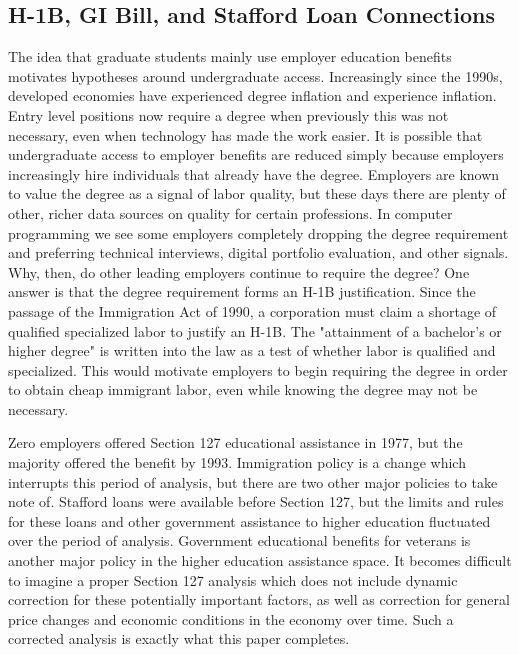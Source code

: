 \documentclass[review]{elsarticle}
\begin{document}
    \subsection{H-1B, GI Bill, and Stafford Loan Connections}
    The idea that graduate students mainly use employer education benefits motivates hypotheses around undergraduate access.
    Increasingly since the 1990s, developed economies have experienced degree inflation and experience inflation.
    Entry level positions now require a degree when previously this was not necessary, even when technology has made the work easier.
    It is possible that undergraduate access to employer benefits are reduced simply because employers increasingly hire individuals that already have the degree.
    Employers are known to value the degree as a signal of labor quality, but these days there are plenty of other, richer data sources on quality for certain professions.
    In computer programming we see some employers completely dropping the degree requirement and preferring technical interviews, digital portfolio evaluation, and other signals.
    Why, then, do other leading employers continue to require the degree?
    One answer is that the degree requirement forms an H-1B justification.
    Since the passage of the Immigration Act of 1990\cite{law1990law}, a corporation must claim a shortage of qualified specialized labor to justify an H-1B.
    The "attainment of a bachelor's or higher degree" is written into the law as a test of whether labor is qualified and specialized.
    This would motivate employers to begin requiring the degree in order to obtain cheap immigrant labor, even while knowing the degree may not be necessary.

    Zero employers offered Section 127 educational assistance in 1977, but the majority offered the benefit by 1993.
    Immigration policy is a change which interrupts this period of analysis, but there are two other major policies to take note of.
    Stafford loans were available before Section 127, but the limits and rules for these loans and other government assistance to higher education fluctuated over the period of analysis.
    Government educational benefits for veterans is another major policy in the higher education assistance space.
    It becomes difficult to imagine a proper Section 127 analysis which does not include dynamic correction for these potentially important factors,
    as well as correction for general price changes and economic conditions in the economy over time.
    Such a corrected analysis is exactly what this paper completes.
\end{document}
